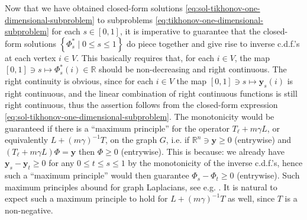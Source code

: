 \documentclass[letterpaper]{article} %
\begin{document}
Now that we have obtained closed-form solutions \eqref{eq:sol-tikhonov-one-dimensional-subproblem} to subproblems \eqref{eq:tikhonov-one-dimensional-subproblem} for each $s\in \left[ 0,1 \right]$, it is imperative to guarantee that the closed-form solutions $\left\{ \Phi_s^{*}\mid 0\leq s\leq 1 \right\}$ do piece together and give rise to inverse c.d.f.'s at each vertex $i\in V$. This basically requires that, for each $i\in V$, the map $\left[ 0,1 \right]\ni s\mapsto \Phi_s^{*}\left( i \right)\in\mathbb{R}$ should be non-decreasing and right continuous. The right continuity is obvious, since for each $i\in V$ the map $\left[ 0,1 \right]\ni s\mapsto \mathbf{y}_s \left( i \right)$ is right continuous, and the linear combination of right continuous functions is still right continuous, thus the assertion follows from the closed-form expression \eqref{eq:sol-tikhonov-one-dimensional-subproblem}. The monotonicity would be guaranteed if there is a ``maximum principle'' for the operator $T_{\ell}+m\gamma L$, or equivalently $L+\left( m\gamma \right)^{-1}T$, on the graph $G$, i.e. if $\mathbb{R}^{n}\ni \mathbf{y}\geq 0$ (entrywise) and $\left( T_{\ell}+m\gamma L \right)\Phi=\mathbf{y}$ then $\Phi\geq 0$ (entrywise). This is because: we already have $\mathbf{y}_s-\mathbf{y}_t\geq 0$ for any $0\leq t\leq s\leq 1$ by the monotonicity of the inverse c.d.f.'s, hence such a ``maximum principle'' would then guarantee $\Phi_s-\Phi_t\geq 0$ (entrywise). Such maximum principles abound for graph Laplacians, see e.g. \cite{HS1997,CCK2007}. It is natural to expect such a maximum principle to hold for $L+\left( m\gamma \right)^{-1}T$ as well, since $T$ is a non-negative.
\end{document}

